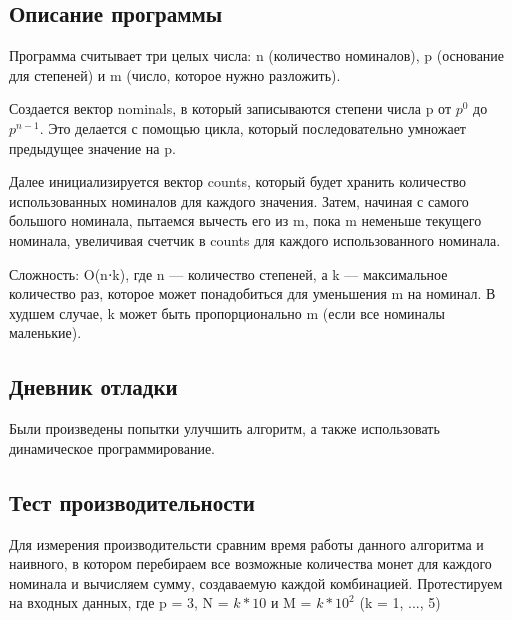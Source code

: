 \documentclass[12pt]{article}
\begin{document}
\subsection*{Описание программы}

Программа считывает три целых числа: n (количество номиналов), p (основание для степеней) и m (число, которое нужно разложить).

Создается вектор nominals, в который записываются степени числа p от $p^0$ до $p^{n - 1}$. Это делается с помощью цикла, который последовательно умножает предыдущее значение на p.

Далее инициализируется вектор counts, который будет хранить количество использованных номиналов для каждого значения. Затем, начиная с самого большого номинала, пытаемся вычесть его из m, пока m неменьше текущего номинала, увеличивая счетчик в counts для каждого использованного номинала.

Сложность: O(n⋅k), где n — количество степеней, а k — максимальное количество раз, которое может понадобиться для уменьшения m на номинал. В худшем случае, k может быть пропорционально m (если все номиналы маленькие).


\subsection*{Дневник отладки}

Были произведены попытки улучшить алгоритм, а также использовать динамическое программирование.

\subsection*{Тест производительности}

Для измерения производительсти сравним время работы данного алгоритма и наивного, в котором перебираем все возможные количества монет для каждого номинала и вычисляем сумму, создаваемую каждой комбинацией. Протестируем на входных данных, где p = 3, N = $k * 10$ и M = $k * 10^2$ (k = 1, ..., 5)
	
\end{document}
